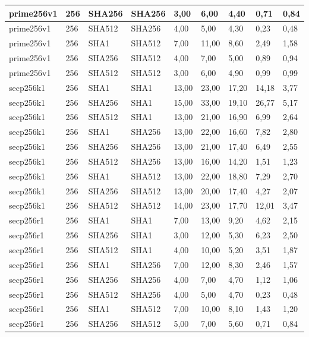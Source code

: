 \begin{longtable}{| l | l | l | l | l |l |l |l |l |}
prime256v1 & 256 & SHA256 & SHA256 & 3,00 & 6,00 & 4,40 & 0,71 & 0,84 \\ \hline 
prime256v1 & 256 & SHA512 & SHA256 & 4,00 & 5,00 & 4,30 & 0,23 & 0,48 \\ \hline 
prime256v1 & 256 & SHA1 & SHA512 & 7,00 & 11,00 & 8,60 & 2,49 & 1,58 \\ \hline 
prime256v1 & 256 & SHA256 & SHA512 & 4,00 & 7,00 & 5,00 & 0,89 & 0,94 \\ \hline 
prime256v1 & 256 & SHA512 & SHA512 & 3,00 & 6,00 & 4,90 & 0,99 & 0,99 \\ \hline 
secp256k1 & 256 & SHA1 & SHA1 & 13,00 & 23,00 & 17,20 & 14,18 & 3,77 \\ \hline 
secp256k1 & 256 & SHA256 & SHA1 & 15,00 & 33,00 & 19,10 & 26,77 & 5,17 \\ \hline 
secp256k1 & 256 & SHA512 & SHA1 & 13,00 & 21,00 & 16,90 & 6,99 & 2,64 \\ \hline 
secp256k1 & 256 & SHA1 & SHA256 & 13,00 & 22,00 & 16,60 & 7,82 & 2,80 \\ \hline 
secp256k1 & 256 & SHA256 & SHA256 & 13,00 & 21,00 & 17,40 & 6,49 & 2,55 \\ \hline 
secp256k1 & 256 & SHA512 & SHA256 & 13,00 & 16,00 & 14,20 & 1,51 & 1,23 \\ \hline 
secp256k1 & 256 & SHA1 & SHA512 & 13,00 & 22,00 & 18,80 & 7,29 & 2,70 \\ \hline 
secp256k1 & 256 & SHA256 & SHA512 & 13,00 & 20,00 & 17,40 & 4,27 & 2,07 \\ \hline 
secp256k1 & 256 & SHA512 & SHA512 & 14,00 & 23,00 & 17,70 & 12,01 & 3,47 \\ \hline 
secp256r1 & 256 & SHA1 & SHA1 & 7,00 & 13,00 & 9,20 & 4,62 & 2,15 \\ \hline 
secp256r1 & 256 & SHA256 & SHA1 & 3,00 & 12,00 & 5,30 & 6,23 & 2,50 \\ \hline 
secp256r1 & 256 & SHA512 & SHA1 & 4,00 & 10,00 & 5,20 & 3,51 & 1,87 \\ \hline 
secp256r1 & 256 & SHA1 & SHA256 & 7,00 & 12,00 & 8,30 & 2,46 & 1,57 \\ \hline 
secp256r1 & 256 & SHA256 & SHA256 & 4,00 & 7,00 & 4,70 & 1,12 & 1,06 \\ \hline 
secp256r1 & 256 & SHA512 & SHA256 & 4,00 & 5,00 & 4,70 & 0,23 & 0,48 \\ \hline 
secp256r1 & 256 & SHA1 & SHA512 & 7,00 & 10,00 & 8,10 & 1,43 & 1,20 \\ \hline 
secp256r1 & 256 & SHA256 & SHA512 & 5,00 & 7,00 & 5,60 & 0,71 & 0,84 \\ \hline 

\end{longtable}
